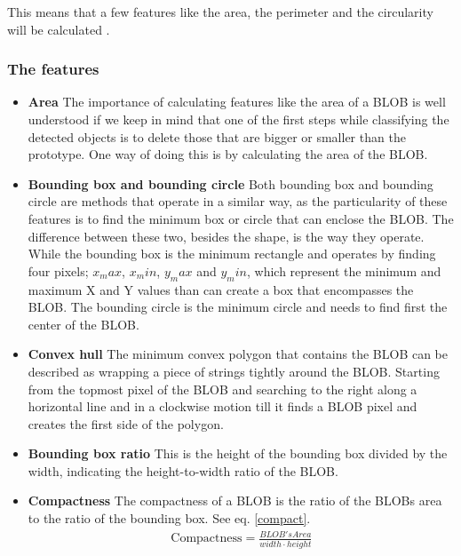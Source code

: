 {This means that a few features like the area, the perimeter and the circularity will be calculated \citep{ip_book}.
\subsubsection{The features}


\begin{itemize}
\item \textbf{Area}
The importance of calculating features like the area of a BLOB is well understood if we keep in mind that one of the first steps while classifying the detected objects is to delete those that are bigger or smaller than the prototype. One way of doing this is by calculating the area of the BLOB.
\item \textbf{Bounding box and bounding circle}
Both bounding box and bounding circle are methods that operate in a similar way, as the particularity of these features is to find the minimum box or circle that can enclose the BLOB. The difference between these two, besides the shape, is the way they operate. While the bounding box is the minimum rectangle and operates by finding four pixels; $x_max$, $x_min$, $y_max$ and $y_min$, which represent the minimum and maximum X and Y values than can create a box that encompasses the BLOB. The bounding circle is the minimum circle and needs to find first the center of the BLOB.
\item \textbf{Convex hull}
The minimum convex polygon that contains the BLOB can be described as wrapping a piece of strings tightly around the BLOB. Starting from the topmost pixel of the BLOB and searching to the right along a horizontal line and in a clockwise motion till it finds a BLOB pixel and creates the first side of the polygon.
\item \textbf{Bounding box ratio}
This is the height of the bounding box divided by the width, indicating the height-to-width ratio of the BLOB.
\item \textbf{Compactness}
The compactness of a BLOB is the ratio of the BLOBs area to the ratio of the bounding box. See eq. \ref{compact}.
\begin{equation}
	\begin{aligned}
	\text{Compactness}=\displaystyle\frac{BLOB's Area}{width\cdot{height}}
	\label{compact}
	\end{aligned}
\end{equation}


\end{itemize}}
